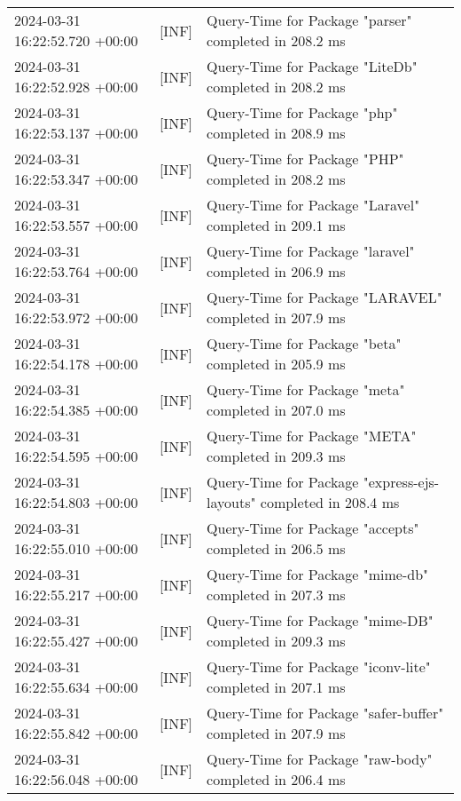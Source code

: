 {{\begin{tabularx}{\textwidth}{|l|l|X|}
                    2024-03-31 16:22:52.720 +00:00 & [INF] & Query-Time for Package "parser" completed in 208.2 ms \\
                    2024-03-31 16:22:52.928 +00:00 & [INF] & Query-Time for Package "LiteDb" completed in 208.2 ms \\
                    2024-03-31 16:22:53.137 +00:00 & [INF] & Query-Time for Package "php" completed in 208.9 ms \\
                    2024-03-31 16:22:53.347 +00:00 & [INF] & Query-Time for Package "PHP" completed in 208.2 ms \\
                    2024-03-31 16:22:53.557 +00:00 & [INF] & Query-Time for Package "Laravel" completed in 209.1 ms \\
                    2024-03-31 16:22:53.764 +00:00 & [INF] & Query-Time for Package "laravel" completed in 206.9 ms \\
                    2024-03-31 16:22:53.972 +00:00 & [INF] & Query-Time for Package "LARAVEL" completed in 207.9 ms \\
                    2024-03-31 16:22:54.178 +00:00 & [INF] & Query-Time for Package "beta" completed in 205.9 ms \\
                    2024-03-31 16:22:54.385 +00:00 & [INF] & Query-Time for Package "meta" completed in 207.0 ms \\
                    2024-03-31 16:22:54.595 +00:00 & [INF] & Query-Time for Package "META" completed in 209.3 ms \\
                    2024-03-31 16:22:54.803 +00:00 & [INF] & Query-Time for Package "express-ejs-layouts" completed in 208.4 ms \\
                    2024-03-31 16:22:55.010 +00:00 & [INF] & Query-Time for Package "accepts" completed in 206.5 ms \\
                    2024-03-31 16:22:55.217 +00:00 & [INF] & Query-Time for Package "mime-db" completed in 207.3 ms \\
                    2024-03-31 16:22:55.427 +00:00 & [INF] & Query-Time for Package "mime-DB" completed in 209.3 ms \\
                    2024-03-31 16:22:55.634 +00:00 & [INF] & Query-Time for Package "iconv-lite" completed in 207.1 ms \\
                    2024-03-31 16:22:55.842 +00:00 & [INF] & Query-Time for Package "safer-buffer" completed in 207.9 ms \\
                    2024-03-31 16:22:56.048 +00:00 & [INF] & Query-Time for Package "raw-body" completed in 206.4 ms \\

\end{tabularx}}}
